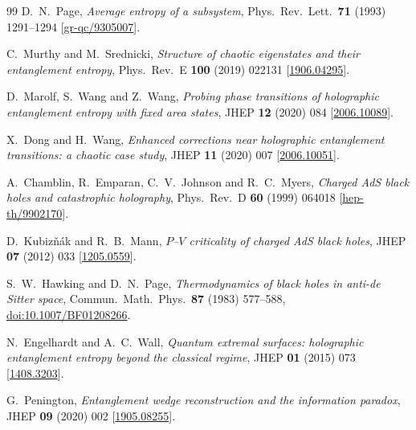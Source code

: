 \documentclass[11pt,letterpaper]{article}
\theoremstyle{plain}
\theoremstyle{definition}
\theoremstyle{remark}
\begin{document}
\begin{thebibliography}{99}
D.~N.~Page, \emph{Average entropy of a subsystem},
Phys.\ Rev.\ Lett.\ \textbf{71} (1993) 1291--1294
[\href{https://arxiv.org/abs/gr-qc/9305007}{gr-qc/9305007}].

C.~Murthy and M.~Srednicki, \emph{Structure of chaotic eigenstates and their entanglement entropy},
Phys.\ Rev.\ E \textbf{100} (2019) 022131
[\href{https://arxiv.org/abs/1906.04295}{1906.04295}].

D.~Marolf, S.~Wang and Z.~Wang, \emph{Probing phase transitions of holographic entanglement entropy with fixed area states},
JHEP \textbf{12} (2020) 084
[\href{https://arxiv.org/abs/2006.10089}{2006.10089}].

X.~Dong and H.~Wang, \emph{Enhanced corrections near holographic entanglement transitions: a chaotic case study},
JHEP \textbf{11} (2020) 007
[\href{https://arxiv.org/abs/2006.10051}{2006.10051}].

A.~Chamblin, R.~Emparan, C.~V.~Johnson and R.~C.~Myers,
\emph{Charged AdS black holes and catastrophic holography},
Phys.\ Rev.\ D \textbf{60} (1999) 064018
[\href{https://arxiv.org/abs/hep-th/9902170}{hep-th/9902170}].

D.~Kubiz\v{n}\'{a}k and R.~B.~Mann, \emph{$P$--$V$ criticality of charged AdS black holes},
JHEP \textbf{07} (2012) 033
[\href{https://arxiv.org/abs/1205.0559}{1205.0559}].

S.~W.~Hawking and D.~N.~Page, \emph{Thermodynamics of black holes in anti-de Sitter space},
Commun.\ Math.\ Phys.\ \textbf{87} (1983) 577--588,
\href{https://doi.org/10.1007/BF01208266}{doi:10.1007/BF01208266}.

N.~Engelhardt and A.~C.~Wall, \emph{Quantum extremal surfaces: holographic entanglement entropy beyond the classical regime},
JHEP \textbf{01} (2015) 073
[\href{https://arxiv.org/abs/1408.3203}{1408.3203}].

G.~Penington, \emph{Entanglement wedge reconstruction and the information paradox},
JHEP \textbf{09} (2020) 002
[\href{https://arxiv.org/abs/1905.08255}{1905.08255}].


\end{thebibliography}
\end{document}
